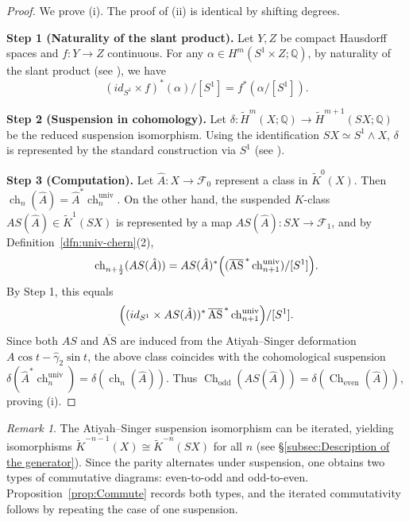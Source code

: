 \documentclass{amsart}
\theoremstyle{definition}
\theoremstyle{remark}
\newtheorem{rem}[thm]{Remark}
\begin{document}
\begin{proof}
We prove (i). The proof of (ii) is identical by shifting degrees.

\smallskip
\noindent\textbf{Step 1 (Naturality of the slant product).}
Let $Y,Z$ be compact Hausdorff spaces and $f:Y\to Z$ continuous.
For any $\alpha\in H^{m}(S^{1}\times Z;\mathbb{Q})$, by naturality of the slant product
(see \cite{Hatcher}), we have
\[
(id_{S^{1}}\times f)^{*}(\alpha)/[S^{1}] = f^{*}(\alpha/[S^{1}]).
\]

\smallskip
\noindent\textbf{Step 2 (Suspension in cohomology).}
Let $\delta:\tilde H^{m}(X;\mathbb{Q})\to \tilde H^{m+1}(SX;\mathbb{Q})$ be the reduced suspension isomorphism.
Using the identification $SX\simeq S^{1}\wedge X$, $\delta$ is represented by the standard construction
via $S^{1}$ (see \cite{Hatcher}).

\smallskip
\noindent\textbf{Step 3 (Computation).}
Let $\hat A:X\to \mathcal{F}_{0}$ represent a class in $\tilde K^{0}(X)$.
Then $\operatorname{ch}_{n}(\hat A)=\hat A^{*}\operatorname{ch}^{\mathrm{univ}}_{n}$.
On the other hand, the suspended $K$-class $AS(\hat A)\in \tilde K^{1}(SX)$ is represented by a map
$AS(\hat A):SX\to \mathcal{F}_{1}$, and by Definition~\ref{dfn:univ-chern}(2),
\[
\operatorname{ch}_{n+\frac12}(AS(\hat A))
=
AS(\hat A)^{*}\Bigl( (\overline{\mathrm{AS}}^{\,*}\operatorname{ch}^{\mathrm{univ}}_{n+1})/[S^{1}] \Bigr).
\]
By Step 1, this equals
\[
\Bigl( (id_{S^{1}}\times AS(\hat A))^{*}\,\overline{\mathrm{AS}}^{\,*}\operatorname{ch}^{\mathrm{univ}}_{n+1}\Bigr)/[S^{1}].
\]
Since both $AS$ and $\overline{\mathrm{AS}}$ are induced from the Atiyah--Singer deformation
$A\cos t-\hat\gamma_{2}\sin t$, the above class coincides with the cohomological suspension
$\delta(\hat A^{*}\operatorname{ch}^{\mathrm{univ}}_{n})=\delta(\operatorname{ch}_{n}(\hat A))$.
Thus $\operatorname{Ch}_{\mathrm{odd}}(AS(\hat A))=\delta(\operatorname{Ch}_{\mathrm{even}}(\hat A))$, proving (i).
\end{proof}

\begin{rem}\label{rem:iterated-AS}
The Atiyah--Singer suspension isomorphism can be iterated, yielding isomorphisms
$\tilde K^{-n-1}(X)\cong \tilde K^{-n}(SX)$ for all $n$ (see \S\ref{subsec:Description of the generator}).
Since the parity alternates under suspension, one obtains two types of commutative diagrams:
even-to-odd and odd-to-even. Proposition~\ref{prop:Commute} records both types, and the
iterated commutativity follows by repeating the case of one suspension.
\end{rem}
\end{document}

